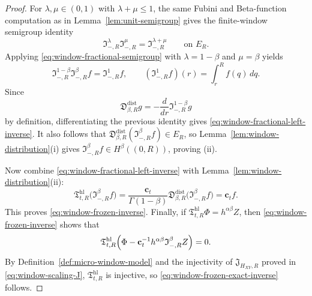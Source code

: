 \documentclass[11pt,a4paper]{amsart}
\theoremstyle{plain}
\theoremstyle{definition}
\theoremstyle{remark}
\begin{document}
\begin{proof}
For \(\lambda,\mu\in(0,1)\) with \(\lambda+\mu\le1\), the same Fubini and Beta-function
computation as in Lemma~\ref{lem:unit-semigroup} gives the finite-window semigroup identity
\begin{equation}\label{eq:window-fractional-semigroup}
\mathfrak I_{-,R}^{\lambda}\mathfrak I_{-,R}^{\mu}
=
\mathfrak I_{-,R}^{\lambda+\mu}
\qquad\text{on }E_R.
\end{equation}
Applying \eqref{eq:window-fractional-semigroup} with \(\lambda=1-\beta\) and \(\mu=\beta\) yields
\[
\mathfrak I_{-,R}^{1-\beta}\mathfrak I_{-,R}^{\beta}f
=
\mathfrak I_{-,R}^{1}f,
\qquad
(\mathfrak I_{-,R}^{1}f)(r)=\int_r^R f(q)\,dq.
\]
Since
\[
\mathfrak D_{\beta,R}^{\mathrm{dist}}g
=
-\frac{d}{dr}\mathfrak I_{-,R}^{1-\beta}g
\]
by definition, differentiating the previous identity gives
\eqref{eq:window-fractional-left-inverse}. It also follows that
\(\mathfrak D_{\beta,R}^{\mathrm{dist}}(\mathfrak I_{-,R}^{\beta}f)\in E_R\), so
Lemma~\ref{lem:window-distribution}(i) gives
\(\mathfrak I_{-,R}^{\beta}f\in H^\beta((0,R))\), proving (ii).

Now combine \eqref{eq:window-fractional-left-inverse} with
Lemma~\ref{lem:window-distribution}(ii):
\[
\mathfrak T_{t,R}^{\mathrm{hl}}
\bigl(
\mathfrak I_{-,R}^{\beta}f
\bigr)
=
\frac{\mathbf c_t}{\Gamma(1-\beta)}
\mathfrak D_{\beta,R}^{\mathrm{dist}}
\bigl(
\mathfrak I_{-,R}^{\beta}f
\bigr)
=
\mathbf c_t f.
\]
This proves \eqref{eq:window-frozen-inverse}. Finally, if
\(\mathfrak T_{t,R}^{\mathrm{hl}}\Phi=h^{\alpha\beta}Z\), then
\eqref{eq:window-frozen-inverse} shows that
\[
\mathfrak T_{t,R}^{\mathrm{hl}}
\Bigl(
\Phi-\mathbf c_t^{-1}h^{\alpha\beta}\mathfrak I_{-,R}^{\beta}Z
\Bigr)
=
0.
\]
By Definition~\ref{def:micro-window-model} and the injectivity of \(\mathfrak J_{H_{XY},R}\)
proved in \eqref{eq:window-scaling-J}, \(\mathfrak T_{t,R}^{\mathrm{hl}}\) is injective, so
\eqref{eq:window-frozen-exact-inverse} follows.
\end{proof}
\end{document}
